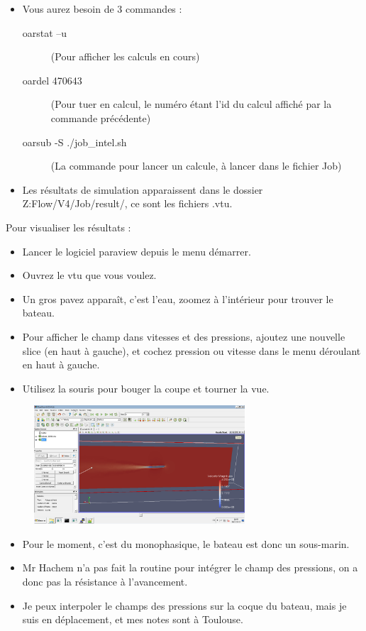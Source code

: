 \documentclass[a4paper, 11pt]{report}
\begin{document}
\begin{itemize}
\item Vous aurez besoin de 3 commandes :
\begin{description}
\item[oarstat –u ](Pour afficher les calculs en cours)
\item[oardel 470643 ](Pour tuer en calcul, le numéro étant l’id du calcul affiché par la commande précédente)
\item[oarsub -S ./job\_intel.sh ](La commande pour lancer un calcule, à lancer dans le fichier Job)
\end{description}
\item Les résultats de simulation apparaissent dans le dossier Z:Flow/V4/Job/result/, ce sont les fichiers .vtu.
\end{itemize}

Pour visualiser les résultats :

\begin{itemize}
\item Lancer le logiciel paraview depuis le menu démarrer.
\item Ouvrez le vtu que vous voulez.
\item Un gros pavez apparaît, c’est l’eau, zoomez à l’intérieur pour trouver le bateau.
\item Pour afficher le champ dans vitesses et des pressions, ajoutez une nouvelle slice (en haut à gauche), et cochez pression ou vitesse dans le menu déroulant en haut à gauche.
\item Utilisez la souris pour bouger la coupe et tourner la vue.
\end{itemize}

\begin{figure}[h]
	\begin{center}	\includegraphics[width=0.7\textwidth]{images/CFD4.png}
	\end{center}
\end{figure}

\begin{itemize}
\item Pour le moment, c’est du monophasique, le bateau est donc un sous-marin.
\item Mr Hachem n’a pas fait la routine pour intégrer le champ des pressions, on a donc pas la résistance à l’avancement.
\item Je peux interpoler le champs des pressions sur la coque du bateau, mais je suis en déplacement, et mes notes sont à Toulouse.
\end{itemize}
\end{document}
